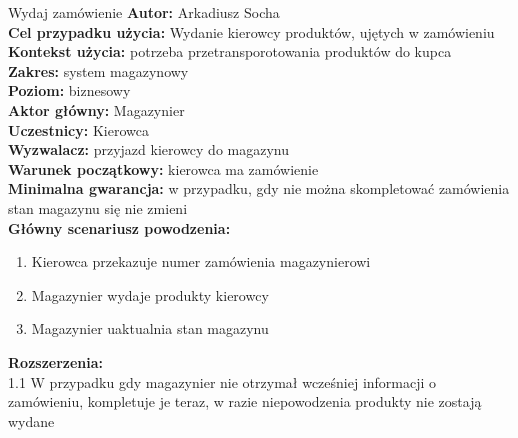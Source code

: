 \begin{usecase}{Wydaj zamówienie}
	\textbf{Autor:} Arkadiusz Socha\\
	\textbf{Cel przypadku użycia:} Wydanie kierowcy produktów, ujętych w zamówieniu \\
	\textbf{Kontekst użycia:} potrzeba przetransporotowania produktów do kupca\\
	\textbf{Zakres:} system magazynowy \\
	\textbf{Poziom:} biznesowy \\
	\textbf{Aktor główny:} Magazynier \\
	\textbf{Uczestnicy:} Kierowca \\
	\textbf{Wyzwalacz:} przyjazd kierowcy do magazynu \\
	\textbf{Warunek początkowy:} kierowca ma zamówienie \\
	\textbf{Minimalna gwarancja:} w przypadku, gdy nie można skompletować zamówienia stan magazynu się nie zmieni \\
	\textbf{Główny scenariusz powodzenia:} 
		\begin{enumerate}
			\item Kierowca przekazuje numer zamówienia magazynierowi
			\item Magazynier wydaje produkty kierowcy
			\item Magazynier uaktualnia stan magazynu
		\end{enumerate}
	\textbf{Rozszerzenia:} \\
	1.1 W przypadku gdy magazynier nie otrzymał wcześniej informacji o zamówieniu, kompletuje je teraz, w razie niepowodzenia produkty nie zostają wydane\\
\end{usecase}

